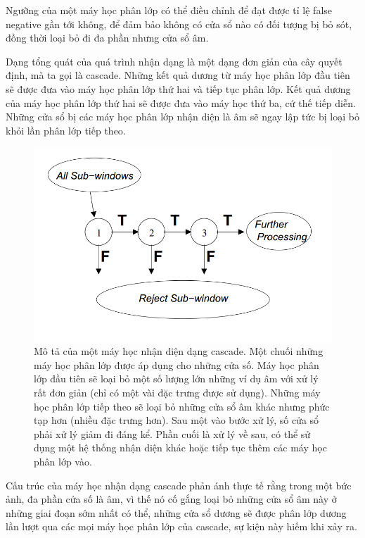 \documentclass[14pt, oneside, a4paper, openany]{scrartcl}
\begin{document}
Ngưỡng của một máy học phân lớp có thể điều chỉnh để đạt được tỉ lệ false negative gần tới không, để đảm bảo không có cửa sổ nào có đối tượng bị bỏ sót, đồng thời loại bỏ đi đa phần nhưng cửa sổ âm.

Dạng tổng quát của quá trình nhận dạng là một dạng đơn giản của cây quyết định, mà ta gọi là cascade. Những kết quả dương từ máy học phân lớp đầu tiên sẽ được đưa vào máy học phân lớp thứ hai và tiếp tục phân lớp. Kết quả dương của máy học phân lớp thứ hai sẽ được đưa vào máy học thứ ba, cứ thế tiếp diễn. Những cửa sổ bị các máy học phân lớp nhận diện là âm sẽ ngay lập tức bị loại bỏ khỏi lần phân lớp tiếp theo.

\begin{figure}
	\centering
	\includegraphics[scale=0.5]{figures/cascadeDetection.png} 
	\caption[Mô tả của một máy học nhận diện dạng cascade]{Mô tả của một máy học nhận diện dạng cascade. Một chuối những máy học phân lớp được áp dụng cho những cửa số. Máy học phân lớp đầu tiên sẽ loại bỏ một số lượng lớn những ví dụ âm với xử lý rất đơn giản (chỉ có một vài đặc trưng được sử dụng). Những máy học phân lớp tiếp theo sẽ loại bỏ những cửa sổ âm khác nhưng phức tạp hơn (nhiều đặc trưng hơn). Sau một vào bước xử lý, số cửa sổ phải xử lý giảm đi đáng kể. Phần cuối là xử lý về sau, có thể sử dụng một hệ thống nhận diện khác hoặc tiếp tục thêm các máy học phân lớp vào.}
\end{figure}
Cấu trúc của máy học nhận dạng cascade phản ánh thực tế rằng trong một bức ảnh, đa phần cửa số là âm, vì thế nó cố gắng loại bỏ những cửa sổ âm này ở những giai đoạn sớm nhất có thể, những cửa sổ dương sẽ được phân lớp dương lần lượt qua các mọi máy học phân lớp của cascade, sự kiện này hiếm khi xảy ra.
\end{document}
